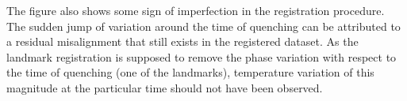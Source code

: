 The figure also shows some sign of imperfection in the registration procedure.
The sudden jump of variation around the time of quenching can be attributed to a residual misalignment that still exists in the registered dataset.
As the landmark registration is supposed to remove the phase variation with respect to the time of quenching (one of the landmarks),
temperature variation of this magnitude at the particular time should not have been observed.

